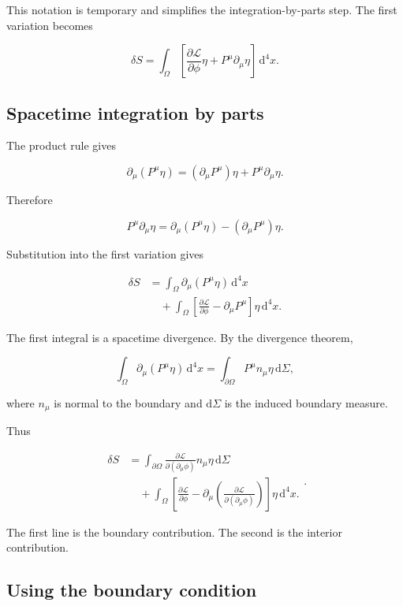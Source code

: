 This notation is temporary and simplifies the integration-by-parts step. The first variation becomes

\[
\delta S
=
\int_{\Omega}
\left[
\frac{\partial\mathcal{L}}{\partial\phi}
\eta
+
P^{\mu}\partial_{\mu}\eta
\right]
\,\mathrm{d}^{4}x.
\]

\subsection{Spacetime integration by parts}

The product rule gives

\[
\partial_{\mu}(P^{\mu}\eta)
=
(\partial_{\mu}P^{\mu})\eta
+
P^{\mu}\partial_{\mu}\eta.
\]

Therefore

\[
P^{\mu}\partial_{\mu}\eta
=
\partial_{\mu}(P^{\mu}\eta)
-
(\partial_{\mu}P^{\mu})\eta.
\]

Substitution into the first variation gives

\[
\begin{aligned}
\delta S
&=
\int_{\Omega}
\partial_{\mu}(P^{\mu}\eta)
\,\mathrm{d}^{4}x\\
&\quad+
\int_{\Omega}
\left[
\frac{\partial\mathcal{L}}{\partial\phi}
-
\partial_{\mu}P^{\mu}
\right]
\eta
\,\mathrm{d}^{4}x.
\end{aligned}
\]

The first integral is a spacetime divergence. By the divergence theorem,

\[
\int_{\Omega}
\partial_{\mu}(P^{\mu}\eta)
\,\mathrm{d}^{4}x
=
\int_{\partial\Omega}
P^{\mu}n_{\mu}\eta
\,\mathrm{d}\Sigma,
\]

where \(n_{\mu}\) is normal to the boundary and \(\mathrm{d}\Sigma\) is the induced boundary measure.

Thus

\[
\boxed{
\begin{aligned}
\delta S
&=
\int_{\partial\Omega}
\frac{\partial\mathcal{L}}
{\partial(\partial_{\mu}\phi)}
n_{\mu}\eta
\,\mathrm{d}\Sigma\\
&\quad+
\int_{\Omega}
\left[
\frac{\partial\mathcal{L}}{\partial\phi}
-
\partial_{\mu}
\left(
\frac{\partial\mathcal{L}}
{\partial(\partial_{\mu}\phi)}
\right)
\right]
\eta
\,\mathrm{d}^{4}x.
\end{aligned}
}.
\]

The first line is the boundary contribution. The second is the interior contribution.

\subsection{Using the boundary condition}

